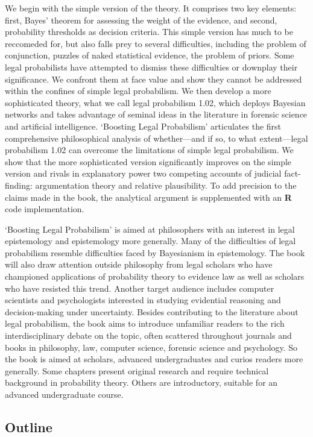 \documentclass[10pt,dvipsnames,enabledeprecatedfontcommands]{scrartcl}
\begin{document}
We begin with the simple version of the theory. It comprises two key
elements: first, Bayes' theorem for assessing the weight of the
evidence, and second, probability thresholds as decision criteria. This
simple version has much to be reccomeded for, but also falls prey to
several difficulties, including the problem of conjunction, puzzles of
naked statistical evidence, the problem of priors. Some legal
probabilists have attempted to dismiss these difficulties or downplay
their significance. We confront them at face value and show they cannot
be addressed within the confines of simple legal probabilism. We then
develop a more sophisticated theory, what we call legal probabilism
1.02, which deploys Bayesian networks and takes advantage of seminal
ideas in the literature in forensic science and artificial intelligence.
`Boosting Legal Probabilism' articulates the first comprehensive
philosophical analysis of whether---and if so, to what extent---legal
probabilism 1.02 can overcome the limitations of simple legal
probabilism. We show that the more sophisticated version significantly
improves on the simple version and rivals in explanatory power two
competing accounts of judicial fact-finding: argumentation theory and
relative plausibility. To add precision to the claims made in the book,
the analytical argument is supplemented with an \textbf{\textsf{R}} code
implementation.

`Boosting Legal Probabilism' is aimed at philosophers with an interest
in legal epistemology and epistemology more generally. Many of the
difficulties of legal probabilism resemble difficulties faced by
Bayesianism in epistemology. The book will also draw attention outside
philosophy from legal scholars who have championed applications of
probability theory to evidence law as well as scholars who have resisted
this trend. Another target audience includes computer scientists and
psychologists interested in studying evidential reasoning and
decision-making under uncertainty. Besides contributing to the
literature about legal probabilism, the book aims to introduce
unfamiliar readers to the rich interdisciplinary debate on the topic,
often scattered throughout journals and books in philosophy, law,
computer science, forensic science and psychology. So the book is aimed
at scholars, advanced undergraduates and curios readers more generally.
Some chapters present original research and require technical background
in probability theory. Others are introductory, suitable for an advanced
undergraduate course.

\hypertarget{outline}{%
\subsection{Outline}\label{outline}}
\end{document}
